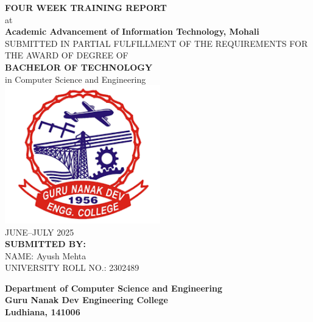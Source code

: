 \documentclass[a4paper,12pt,oneside]{report}
\numberwithin{equation}{chapter}
\numberwithin{figure}{chapter}
\numberwithin{table}{chapter}
\begin{document}
\begin{titlepage}
\begin{center}
    \Large\textbf{FOUR WEEK TRAINING REPORT}\\[3mm]
    \large{at}\\[3mm]
    \Large\textbf{Academic Advancement of Information Technology, Mohali}\\[6mm]
    \normalsize{SUBMITTED IN PARTIAL FULFILLMENT OF THE REQUIREMENTS FOR THE AWARD OF DEGREE OF}\\[3mm]
    \Large\textbf{BACHELOR OF TECHNOLOGY}\\[3mm]
    \large{in Computer Science and Engineering}\\[9mm]
    \includegraphics[height=6cm]{gndeclogo.png}\\[6mm]
    \large{JUNE–JULY 2025}\\[9mm]
    \textbf{SUBMITTED BY:}\\
    NAME: Ayush Mehta\\
    UNIVERSITY ROLL NO.: 2302489
\end{center}

\vspace{10mm}
\begin{center}
    \textbf{Department of Computer Science and Engineering}\\
    \textbf{Guru Nanak Dev Engineering College}\\
    \textbf{Ludhiana, 141006}
\end{center}
\end{titlepage}
\end{document}
